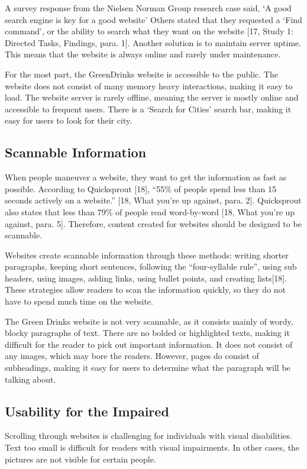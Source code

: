 \documentclass[12pt]{article}
\begin{document}
A survey response from the Nielsen Norman Group research case said, ‘A good search engine is key for a good website’ Others stated that they requested a ‘Find command’,  or the ability to search what they want on the website [17, Study 1: Directed Tasks, Findings, para. 1]. Another solution is to maintain server uptime. This means that the website is always online and rarely under maintenance.

For the most part, the GreenDrinks website is accessible to the public. The website does not consist of many memory heavy interactions, making it easy to load. The website server is rarely offline, meaning the server is mostly online and accessible to frequent users. There is a ‘Search for Cities’ search bar, making it easy for users to look for their city.

\subsection*{Scannable Information}
When people maneuver a website, they want to get the information as fast as possible. According to Quicksprout [18], “55\% of people spend less than 15 seconds actively on a website.” [18, What you’re up against, para. 2]. Quicksprout also states that less than 79\% of people read word-by-word [18, What you’re up against, para. 5]. Therefore, content created for websites should be designed to be scannable. 

Websites create scannable information through these methods: writing shorter paragraphs, keeping short sentences, following the “four-syllable rule”, using sub headers, using images, adding links, using bullet points, and creating lists[18]. These strategies allow readers to scan the information quickly, so they do not have to spend much time on the website.

The Green Drinks website is not very scannable, as it consists mainly of wordy, blocky paragraphs of text. There are no bolded or highlighted texts, making it difficult for the reader to pick out important information. It does not consist of any images, which may bore the readers. However, pages do consist of subheadings, making it easy for users to determine what the paragraph will be talking about.

\subsection*{Usability for the Impaired}
Scrolling through websites is challenging for individuals with visual disabilities. Text too small is difficult for readers with visual impairments. In other cases, the pictures are not visible for certain people.
\end{document}
